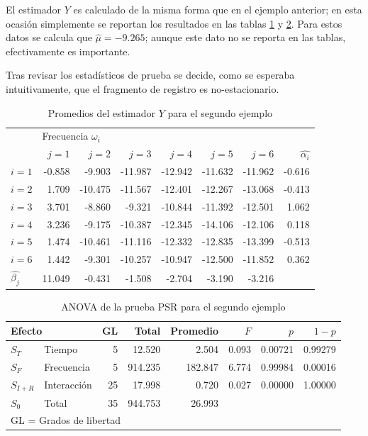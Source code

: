 \documentclass[12pt,letterpaper]{book}
\begin{document}
El estimador $Y$ es calculado de la misma forma que en el ejemplo anterior; en esta ocasión simplemente se reportan los resultados en las tablas \ref{tab:valores_psr_2} y \ref{tab:ejemplo_gl_2}.
%
Para estos datos se calcula que $\widehat{\mu} = -9.265$; aunque este dato no se reporta en las tablas, efectivamente es importante. 

Tras revisar los estadísticos de prueba se decide, como se esperaba intuitivamente, que el fragmento de registro es no-estacionario.

\begin{table}
\caption{Promedios del estimador $Y$ para el segundo ejemplo}
\centering
\begin{tabular}{lrrrrrrr}
\toprule
      & \multicolumn{6}{l}{Frecuencia $\omega_i$} \\
\cmidrule{2-7}
      & $j=1$  & $j=2$   & $j=3$   & $j=4$   & $j=5$   & $j=6$   & $\widehat{\alpha_i}$ \\ 
\midrule
$i=1$ & -0.858 & -9.903  & -11.987 & -12.942 & -11.632 & -11.962 & -0.616 \\
$i=2$ & 1.709  & -10.475 & -11.567 & -12.401 & -12.267 & -13.068 & -0.413 \\
$i=3$ & 3.701  & -8.860  & -9.321  & -10.844 & -11.392 & -12.501 & 1.062  \\
$i=4$ & 3.236  & -9.175  & -10.387 & -12.345 & -14.106 & -12.106 & 0.118  \\
$i=5$ & 1.474  & -10.461 & -11.116 & -12.332 & -12.835 & -13.399 & -0.513 \\
$i=6$ & 1.442  & -9.301  & -10.257 & -10.947 & -12.500 & -11.852 & 0.362  \\
$\widehat{\beta_j}$
     & 11.049 & -0.431  & -1.508  & -2.704  & -3.190  & -3.216  &         \\
\bottomrule
\end{tabular}
\label{tab:valores_psr_2}
\end{table}

\begin{table}
\centering
\caption{ANOVA de la prueba PSR para el segundo ejemplo}
\begin{tabular}{llrrrrrr}
\toprule
\multicolumn{2}{l}{Efecto}
                        & GL & Total   & Promedio & $F$   & $p$     & $1-p$   \\
\midrule
$S_T$     & Tiempo      & 5  & 12.520  & 2.504   & 0.093 & 0.00721 & 0.99279 \\
$S_F$     & Frecuencia  & 5  & 914.235 & 182.847 & 6.774 & 0.99984 & 0.00016 \\
$S_{I+R}$ & Interacción & 25 & 17.998  & 0.720   & 0.027 & 0.00000 & 1.00000 \\
$S_0$     & Total       & 35 & 944.753 & 26.993  &       &         &         \\
\bottomrule
\multicolumn{5}{l}{GL = Grados de libertad}
\end{tabular}
\label{tab:ejemplo_gl_2}
\end{table}
\end{document}

